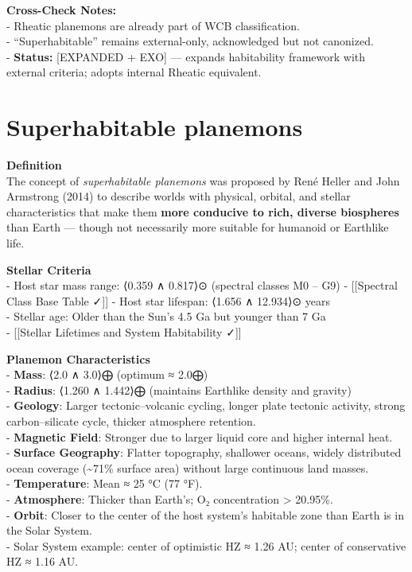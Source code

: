 \documentclass[
  letterpaper,
]{book}
\begin{document}
\textbf{Cross-Check Notes:}\\
- Rheatic planemons are already part of WCB classification.\\
- ``Superhabitable'' remains external-only, acknowledged but not
canonized.\\
- \textbf{Status:} {[}EXPANDED + EXO{]} --- expands habitability
framework with external criteria; adopts internal Rheatic equivalent.

\chapter{Superhabitable planemons}\label{superhabitable-planemons}

\textbf{Definition}\\
The concept of \emph{superhabitable planemons} was proposed by René
Heller and John Armstrong (2014) to describe worlds with physical,
orbital, and stellar characteristics that make them \textbf{more
conducive to rich, diverse biospheres} than Earth --- though not
necessarily more suitable for humanoid or Earthlike life.

\textbf{Stellar Criteria}\\
- Host star mass range: ⟨0.359 ∧ 0.817⟩⊙ (spectral classes M0 -- G9) -
{[}{[}Spectral Class Base Table ✓{]}{]} - Host star lifespan: ⟨1.656 ∧
12.934⟩⊙ years\\
- Stellar age: Older than the Sun's 4.5 Ga but younger than 7 Ga\\
- {[}{[}Stellar Lifetimes and System Habitability ✓{]}{]}

\textbf{Planemon Characteristics}\\
- \textbf{Mass}: ⟨2.0 ∧ 3.0⟩⨁ (optimum ≈ 2.0⨁)\\
- \textbf{Radius}: ⟨1.260 ∧ 1.442⟩⨁ (maintains Earthlike density and
gravity)\\
- \textbf{Geology}: Larger tectonic--volcanic cycling, longer plate
tectonic activity, strong carbon--silicate cycle, thicker atmosphere
retention.\\
- \textbf{Magnetic Field}: Stronger due to larger liquid core and higher
internal heat.\\
- \textbf{Surface Geography}: Flatter topography, shallower oceans,
widely distributed ocean coverage (\textasciitilde71\% surface area)
without large continuous land masses.\\
- \textbf{Temperature}: Mean ≈ 25 °C (77 °F).\\
- \textbf{Atmosphere}: Thicker than Earth's; O₂ concentration
\textgreater{} 20.95\%.\\
- \textbf{Orbit}: Closer to the center of the host system's habitable
zone than Earth is in the Solar System.\\
- Solar System example: center of optimistic HZ ≈ 1.26 AU; center of
conservative HZ ≈ 1.16 AU.
\end{document}
